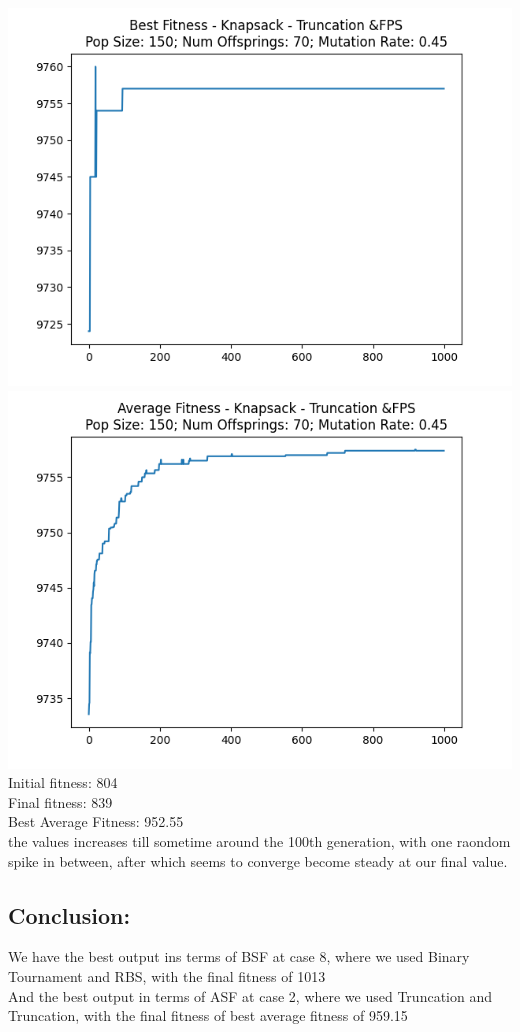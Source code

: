 \documentclass[12pt]{report} %
\begin{document}
\begin{itemize}
	      \includegraphics[scale=0.5]{../Analysis/BSF_Knapsack_3_0_150_70.png}
	      \includegraphics[scale=0.5]{../Analysis/ASF_Knapsack_3_0_150_70.png}
	      \\Initial fitness:  804
	      \\Final fitness:  839
	      \\Best Average Fitness: 952.55
	      \\the values increases till sometime around the 100th generation, with one raondom spike in between, after which seems to converge become steady at our final value.
\end{itemize}

\subsection*{Conclusion:}
We have the best output ins terms of BSF at case 8, where we used Binary Tournament and RBS, with the final fitness of 1013
\\And the best output in terms of ASF at case 2, where we used Truncation and Truncation,  with the final fitness of best average fitness of 959.15
\end{document}
